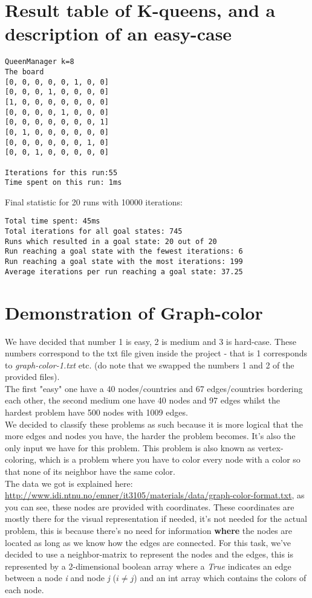\documentclass[12pt, a4paper]{article}
\begin{document}
\section{Result table of K-queens, and a description of an easy-case}
\begin{verbatim}
QueenManager k=8
The board 
[0, 0, 0, 0, 0, 1, 0, 0]
[0, 0, 0, 1, 0, 0, 0, 0]
[1, 0, 0, 0, 0, 0, 0, 0]
[0, 0, 0, 0, 1, 0, 0, 0]
[0, 0, 0, 0, 0, 0, 0, 1]
[0, 1, 0, 0, 0, 0, 0, 0]
[0, 0, 0, 0, 0, 0, 1, 0]
[0, 0, 1, 0, 0, 0, 0, 0]

Iterations for this run:55
Time spent on this run: 1ms
\end{verbatim}

Final statistic for 20 runs with 10000 iterations:
\begin{verbatim}
Total time spent: 45ms
Total iterations for all goal states: 745
Runs which resulted in a goal state: 20 out of 20
Run reaching a goal state with the fewest iterations: 6
Run reaching a goal state with the most iterations: 199
Average iterations per run reaching a goal state: 37.25
\end{verbatim}


\section{Demonstration of Graph-color}
We have decided that number 1 is easy, 2 is medium and 3 is hard-case.  These numbers correspond to the txt file given inside the project - that is 1 corresponds to \textit{graph-color-1.txt} etc. (do note that we swapped the numbers 1 and 2 of the provided files).\\
The first "easy" one have a 40 nodes/countries and 67 edges/countries bordering each other, the second medium one have 40 nodes and 97 edges whilst the hardest problem have 500 nodes with 1009 edges.\\ 
We decided to classify these problems as such because it is more logical that the more edges and nodes you have, the harder the problem becomes. It's also the only input we have for this problem.
This problem is also known as vertex-coloring, which is a problem where you have to color every node with a color so that none of its neighbor have the same color.\\
The data we got is explained here:\\ \href{http://www.idi.ntnu.no/emner/it3105/materials/data/graph-color-format.txt}{http://www.idi.ntnu.no/emner/it3105/materials/data/graph-color-format.txt},
as you can see, these nodes are provided with coordinates. These coordinates are mostly there for the visual representation if needed, it's not needed for the actual problem, this is because there's no need for information \textbf{where} the nodes are located as long as we know how the edges are connected. For this task, we've decided to use a neighbor-matrix to represent the nodes and the edges, this is represented by a 2-dimensional boolean array where a \textit{True} indicates an edge between a node \textit{i} and node \textit{j} ($i \neq j$) and an int array which contains the colors of each node.
\end{document}
